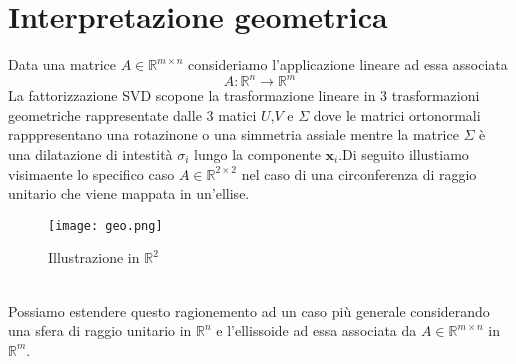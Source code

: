 \documentclass[11pt]{article}
\newcommand{\R}{\mathbb R}
\begin{document}
\section{Interpretazione geometrica}
Data una matrice $A \in \R^{m \times n}$ consideriamo l'applicazione lineare ad essa associata $$A: \R^n \rightarrow \R^m$$
La fattorizzazione SVD scopone la trasformazione lineare in 3 trasformazioni geometriche rappresentate dalle 3 matici $U$,$V$ e $\Sigma$ dove le matrici ortonormali rapppresentano una rotazinone o una simmetria assiale mentre la matrice $\Sigma$ è una dilatazione di intestità $\sigma_i$ lungo la componente $\mathbf{x}_i$.Di seguito illustiamo visimaente lo specifico caso $A \in \R^{2 \times 2}$ nel caso di una circonferenza di raggio unitario che viene mappata in un'ellise.
\begin{figure}[h]
    \centering
    \texttt{[image: geo.png]}
    \caption{Illustrazione in $\R^2$}
    \label{fig:geo}
\end{figure}
\noindent \\
Possiamo estendere questo ragionemento ad un caso più generale considerando una sfera di raggio unitario in $\R^n$ e l'ellissoide ad essa associata da $A \in \R^{m \times n}$ in $\R^m$.\\
\end{document}
